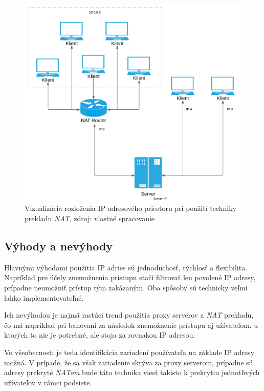 \documentclass[
  printed, %
  table,   %
  lof,     %
  lot,     %
]{fithesis3}
\begin{document}
\begin{figure}[h]
  \centering
    \includegraphics[width=.99\textwidth]{images/tech-IP-NAT.png}
  \caption{Vizualizácia rozloženia IP adresového priestoru pri použití techniky
  prekladu \textit{NAT}, zdroj: vlastné spracovanie}
  \label{fig:tech-IP-NAT}
\end{figure}

\subsection{Výhody a nevýhody}
Hlavnými výhodami použitia IP adries sú jednoduchosť, rýchlosť a flexibilita.
Napríklad pre účely znemožnenia prístupu stačí filtrovať len povolené IP
adresy, prípadne neumožniť prístup tým zakázaným. Oba spôsoby sú technicky veľmi
ľahko implementovateľné.

Ich nevýhodou je najmä rastúci trend použitia proxy serverov a \textit{NAT}
prekladu, čo má napríklad pri banovaní za následok znemožnenie prístupu aj
užívateľom, u ktorých to nie je potrebné, ale stoja za rovnakou IP adresou.

Vo všeobecnosti je teda identifikácia zariadení používateľa na základe IP
adresy možná. V prípade, že sa však zariadenie skrýva za proxy serverom,
prípadne sú adresy prekryté \textit{NATom} bude táto technika viesť takisto k
prekrytiu jednotlivých užívateľov v rámci podsiete.
\end{document}
